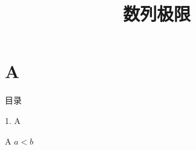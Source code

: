 \documentclass[aspectratio=169,10pt,fontset=fandol]{ctexbeamer}
\title{数列极限}
\begin{document}
\section{A}
\begin{frame}[t,fragile]{目录}
\normalsize
{\color{blue}\normalsize 1. A\par}\vspace{0.22em}
\end{frame}
\begin{frame}[t,fragile]{A}
\normalsize
{\normalsize
$a<b$
}
\end{frame}
\end{document}

